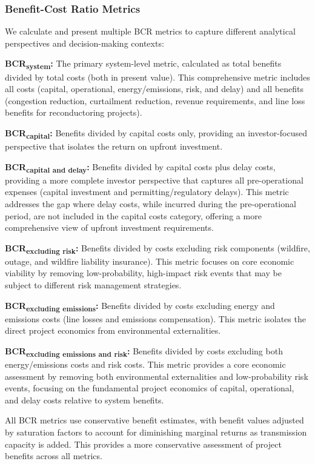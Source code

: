 \documentclass[11pt,twocolumn,a4paper]{article}
\begin{document}
\subsubsection{Benefit-Cost Ratio Metrics}

We calculate and present multiple BCR metrics to capture different analytical perspectives and decision-making contexts:

\textbf{BCR\textsubscript{system}:} The primary system-level metric, calculated as total benefits divided by total costs (both in present value). This comprehensive metric includes all costs (capital, operational, energy/emissions, risk, and delay) and all benefits (congestion reduction, curtailment reduction, revenue requirements, and line loss benefits for reconductoring projects).

\textbf{BCR\textsubscript{capital}:} Benefits divided by capital costs only, providing an investor-focused perspective that isolates the return on upfront investment.

\textbf{BCR\textsubscript{capital and delay}:} Benefits divided by capital costs plus delay costs, providing a more complete investor perspective that captures all pre-operational expenses (capital investment and permitting/regulatory delays). This metric addresses the gap where delay costs, while incurred during the pre-operational period, are not included in the capital costs category, offering a more comprehensive view of upfront investment requirements.

\textbf{BCR\textsubscript{excluding risk}:} Benefits divided by costs excluding risk components (wildfire, outage, and wildfire liability insurance). This metric focuses on core economic viability by removing low-probability, high-impact risk events that may be subject to different risk management strategies.

\textbf{BCR\textsubscript{excluding emissions}:} Benefits divided by costs excluding energy and emissions costs (line losses and emissions compensation). This metric isolates the direct project economics from environmental externalities.

\textbf{BCR\textsubscript{excluding emissions and risk}:} Benefits divided by costs excluding both energy/emissions costs and risk costs. This metric provides a core economic assessment by removing both environmental externalities and low-probability risk events, focusing on the fundamental project economics of capital, operational, and delay costs relative to system benefits.

All BCR metrics use conservative benefit estimates, with benefit values adjusted by saturation factors to account for diminishing marginal returns as transmission capacity is added. This provides a more conservative assessment of project benefits across all metrics.
\end{document}
